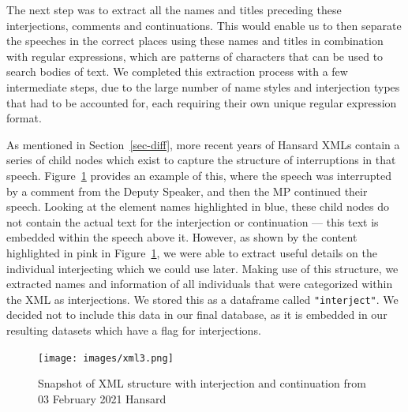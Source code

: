 \documentclass[
  letterpaper,
  DIV=11,
  numbers=noendperiod]{scrartcl}
\begin{document}
The next step was to extract all the names and titles preceding these
interjections, comments and continuations. This would enable us to then
separate the speeches in the correct places using these names and titles
in combination with regular expressions, which are patterns of
characters that can be used to search bodies of text. We completed this
extraction process with a few intermediate steps, due to the large
number of name styles and interjection types that had to be accounted
for, each requiring their own unique regular expression format.

As mentioned in Section~\ref{sec-diff}, more recent years of Hansard
XMLs contain a series of child nodes which exist to capture the
structure of interruptions in that speech. Figure~\ref{fig-xml3}
provides an example of this, where the speech was interrupted by a
comment from the Deputy Speaker, and then the MP continued their speech.
Looking at the element names highlighted in blue, these child nodes do
not contain the actual text for the interjection or continuation ---
this text is embedded within the speech above it. However, as shown by
the content highlighted in pink in Figure~\ref{fig-xml3}, we were able
to extract useful details on the individual interjecting which we could
use later. Making use of this structure, we extracted names and
information of all individuals that were categorized within the XML as
interjections. We stored this as a dataframe called
\texttt{"interject"}. We decided not to include this data in our final
database, as it is embedded in our resulting datasets which have a flag
for interjections.

\begin{figure}

{\centering \texttt{[image: images/xml3.png]}

}

\caption{\label{fig-xml3}Snapshot of XML structure with interjection and
continuation from 03 February 2021 Hansard}

\end{figure}
\end{document}
